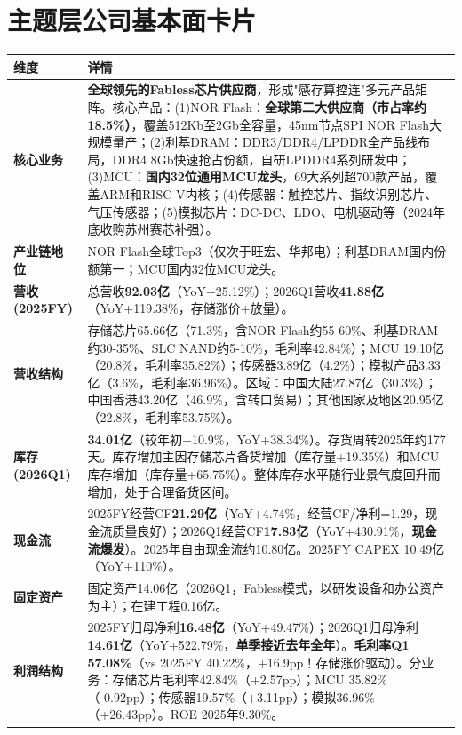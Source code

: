 \section{主题层公司基本面卡片}

\begin{exhibitbox}
\centering
\scriptsize
\renewcommand{\arraystretch}{1.20}
\begin{tabularx}{\exhibitboxwidth}{>{\bfseries}p{2.2cm} >{\raggedright\arraybackslash\sloppy\hspace{0pt}}X}
\toprule
\textbf{维度} & \textbf{详情} \\
\midrule
核心业务 & \textbf{全球领先的Fabless芯片供应商}，形成"感存算控连"多元产品矩阵。核心产品：(1)NOR Flash：\textbf{全球第二大供应商（市占率约18.5\%）}，覆盖512Kb至2Gb全容量，45nm节点SPI NOR Flash大规模量产；(2)利基DRAM：DDR3/DDR4/LPDDR全产品线布局，DDR4 8Gb快速抢占份额，自研LPDDR4系列研发中；(3)MCU：\textbf{国内32位通用MCU龙头}，69大系列超700款产品，覆盖ARM和RISC-V内核；(4)传感器：触控芯片、指纹识别芯片、气压传感器；(5)模拟芯片：DC-DC、LDO、电机驱动等（2024年底收购苏州赛芯补强）。 \\
产业链地位 & NOR Flash全球Top3（仅次于旺宏、华邦电）；利基DRAM国内份额第一；MCU国内32位MCU龙头。 \\
营收(2025FY) & 总营收\textbf{92.03亿}（YoY+25.12\%）；2026Q1营收\textbf{41.88亿}（YoY+119.38\%，存储涨价+放量）。 \\
营收结构 & 存储芯片65.66亿（71.3\%，含NOR Flash约55-60\%、利基DRAM约30-35\%、SLC NAND约5-10\%，毛利率42.84\%）；MCU 19.10亿（20.8\%，毛利率35.82\%）；传感器3.89亿（4.2\%）；模拟产品3.33亿（3.6\%，毛利率36.96\%）。区域：中国大陆27.87亿（30.3\%）；中国香港43.20亿（46.9\%，含转口贸易）；其他国家及地区20.95亿（22.8\%，毛利率53.75\%）。 \\
库存(2026Q1) & \textbf{34.01亿}（较年初+10.9\%，YoY+38.34\%）。存货周转2025年约177天。库存增加主因存储芯片备货增加（库存量+19.35\%）和MCU库存增加（库存量+65.75\%）。整体库存水平随行业景气度回升而增加，处于合理备货区间。 \\
现金流 & 2025FY经营CF\textbf{21.29亿}（YoY+4.74\%，经营CF/净利=1.29，现金流质量良好）；2026Q1经营CF\textbf{17.83亿}（YoY+430.91\%，\textbf{现金流爆发}）。2025年自由现金流约10.80亿。2025FY CAPEX 10.49亿（YoY+110\%）。 \\
固定资产 & 固定资产14.06亿（2026Q1，Fabless模式，以研发设备和办公资产为主）；在建工程0.16亿。 \\
利润结构 & 2025FY归母净利\textbf{16.48亿}（YoY+49.47\%）；2026Q1归母净利\textbf{14.61亿}（YoY+522.79\%，\textbf{单季接近去年全年}）。\textbf{毛利率Q1 57.08\%}（vs 2025FY 40.22\%，+16.9pp！存储涨价驱动）。分业务：存储芯片毛利率42.84\%（+2.57pp）；MCU 35.82\%（-0.92pp）；传感器19.57\%（+3.11pp）；模拟36.96\%（+26.43pp）。ROE 2025年9.30\%。 \\

\end{tabularx}
\end{exhibitbox}
